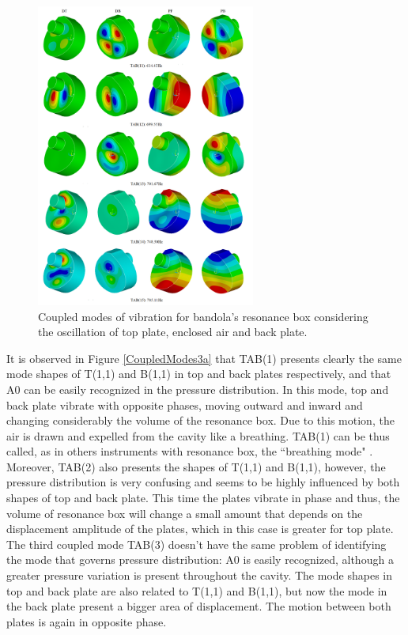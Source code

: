 \begin{figure}[h]
\centering
\includegraphics[height=10cm]{img/FSI3c.png}
\caption{Coupled modes of vibration for bandola's resonance box considering the oscillation of top plate, enclosed air and back plate.}
\label{CoupledModes3c}
\end{figure}

It is observed in Figure \ref{CoupledModes3a} that TAB(1) presents clearly the same mode shapes of T(1,1) and B(1,1) in top and back plates respectively, and that A0 can be easily recognized in the pressure distribution. In this mode, top and back plate vibrate with opposite phases, moving outward and inward and changing considerably the volume of the resonance box. Due to this motion, the air is drawn and expelled from the cavity like a breathing. TAB(1) can be thus called, as in others instruments with resonance box, the ``breathing mode" \cite{Pennstate}. Moreover, TAB(2) also presents the shapes of T(1,1) and B(1,1), however, the pressure distribution is very confusing and seems to be highly influenced by both shapes of top and back plate. This time the plates vibrate in phase and thus, the volume of resonance box will change a small amount that depends on the displacement amplitude of the plates, which in this case is greater for top plate. The third coupled mode TAB(3) doesn't have the same problem of identifying the mode that governs pressure distribution: A0 is easily recognized, although a greater pressure variation is present throughout the cavity. The mode shapes in top and back plate are also related to T(1,1) and B(1,1), but now the mode in the back plate present a bigger area of displacement. The motion between both plates is again in opposite phase.

